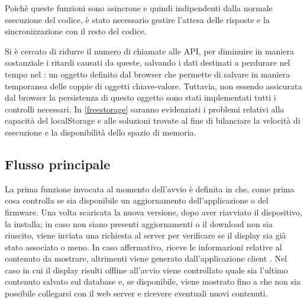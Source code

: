 Poichè queste funzioni sono asincrone e quindi indipendenti dalla normale esecuzione del codice, è stato necessario gestire l'attesa delle risposte e la sincronizzazione con il resto del codice.

 

Si è cercato di ridurre il numero di chiamate alle API, per diminuire in maniera sostanziale i ritardi causati da queste, salvando i dati destinati a perdurare nel tempo nel : un oggetto definito dal browser che permette di salvare in maniera temporanea delle coppie di oggetti chiave-valore. Tuttavia, non essendo assicurata dal browser la persistenza di questo oggetto sono stati implementati tutti i controlli necessari. In \ref*{freestorage} saranno evidenziati i problemi relativi alla capacità del localStorage e alle soluzioni trovate al fine di bilanciare la velocità di esecuzione e la disponibilità dello spazio di memoria.

\subsection{Flusso principale}\label{flusso_principale}

La prima funzione invocata al momento dell'avvio è  definita in  che, come prima cosa controlla se sia disponibile un aggiornamento dell'applicazione o del firmware. Una volta scaricata la nuova versione, dopo aver riavviato il dispositivo, la installa; in caso non siano presenti aggiornamenti o il download non sia riuscito, viene inviata una richiesta al server per verificare se il display sia già stato associato o meno. In caso affermativo, riceve le informazioni relative al contenuto da mostrare, altrimenti viene generato dall'applicazione client . Nel caso in cui il display risulti offline all'avvio viene controllato quale sia l'ultimo contenuto salvato sul database e, se disponibile, viene mostrato fino a che non sia possibile collegarsi con il web server e ricevere eventuali nuovi contenuti.


